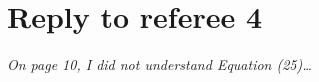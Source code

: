 \documentclass[12pt]{article}
\begin{document}
\section*{\hfill Reply to referee 4\hfill}

\emph{On page 10, I did not understand Equation (25)\dots}
\end{document}
